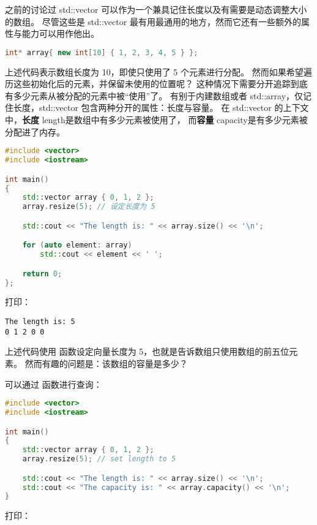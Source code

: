 \documentclass[../../LearnCpp.tex]{subfiles}
\begin{document}

之前的讨论过 std::vector 可以作为一个兼具记住长度以及有需要是动态调整大小的数组。
尽管这些是 std::vector 最有用最通用的地方，然而它还有一些额外的属性与能力可以用作他出。

\begin{lstlisting}[language=C++]
int* array{ new int[10] { 1, 2, 3, 4, 5 } };
\end{lstlisting}

上述代码表示数组长度为 10，即使只使用了 5 个元素进行分配。
然而如果希望遍历这些初始化后的元素，并保留未使用的位置呢？
这种情况下需要分开追踪到底有多少元素从被分配的元素中被“使用”了。
有别于内建数组或者 std::array，仅记住长度，std::vector 包含两种分开的属性：长度与容量。
在 std::vector 的上下文中，\textbf{长度} length是数组中有多少元素被使用了，
而\textbf{容量} capacity是有多少元素被分配进了内存。

\begin{lstlisting}[language=C++]
#include <vector>
#include <iostream>

int main()
{
    std::vector array { 0, 1, 2 };
    array.resize(5); // 设定长度为 5

    std::cout << "The length is: " << array.size() << '\n';

    for (auto element: array)
        std::cout << element << ' ';

    return 0;
};
\end{lstlisting}

打印：

\begin{lstlisting}
The length is: 5
0 1 2 0 0
\end{lstlisting}

上述代码使用  函数设定向量长度为 5，也就是告诉数组只使用数组的前五位元素。
然而有趣的问题是：该数组的容量是多少？

可以通过  函数进行查询：

\begin{lstlisting}[language=C++]
#include <vector>
#include <iostream>

int main()
{
    std::vector array { 0, 1, 2 };
    array.resize(5); // set length to 5

    std::cout << "The length is: " << array.size() << '\n';
    std::cout << "The capacity is: " << array.capacity() << '\n';
}
\end{lstlisting}

打印：
\end{document}
